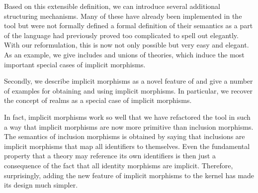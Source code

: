 Based on this extensible definition, we can introduce several additional structuring mechanisms.
Many of these have already been implemented in the \mmt tool but were not formally defined  a formal definition of their semantics as a part of the \mmt language had previously proved too complicated to spell out elegantly.
With our reformulation, this is now not only possible but very easy and elegant.
As an example, we give includes and unions of theories, which induce the most important special cases of implicit morphisms.

Secondly, we describe implicit morphisms as a novel feature of \mmt and give a number of examples for obtaining and using implicit morphisms.
In particular, we recover the concept of realms \cite{realms} as a special case of implicit morphisms.

In fact, implicit morphisms work so well that we have refactored the \mmt tool in such a way that implicit morphisms are now more primitive than inclusion morphisms.
The semantics of inclusion morphisms is obtained by saying that inclusions are implicit morphisms that map all identifiers to themselves.
Even the fundamental property that a theory may reference its own identifiers is then just a consequence of the fact that all identity morphisms are implicit.
Therefore, surprisingly, adding the new feature of implicit morphisms to the \mmt kernel has made its design much simpler.